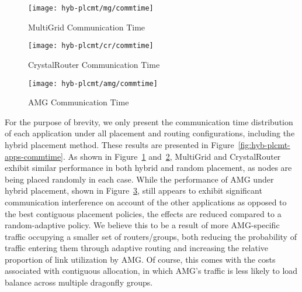 
\begin{figure*}[t!]
    \centering
    \begin{subfigure}[t]{0.32\textwidth}
        \centering
        \texttt{[image: hyb-plcmt/mg/commtime]}
        \caption{MultiGrid Communication Time}
        \label{fig:hyb-plcmt-mg-commtime}
    \end{subfigure}\hfill
    \begin{subfigure}[t]{0.32\textwidth}
        \centering
        \texttt{[image: hyb-plcmt/cr/commtime]}
        \caption{CrystalRouter Communication Time}
        \label{fig:hyb-plcmt-cr-commtime}
    \end{subfigure}\hfill
    \begin{subfigure}[t]{0.32\textwidth}
        \centering
        \texttt{[image: hyb-plcmt/amg/commtime]}
        \caption{AMG Communication Time}
        \label{fig:hyb-plcmt-amg-commtime}
    \end{subfigure}
   \caption{Application communication time. Workload~ is running with all placement and routing configurations. Methods prefixed with ``H'' represent the hybrid allocation approach.}
   \label{fig:hyb-plcmt-apps-commtime}
\end{figure*}

For the purpose of brevity, we only present the
communication time distribution of each application under all placement and routing configurations, including the hybrid placement method. These results are presented in Figure~\ref{fig:hyb-plcmt-apps-commtime}. 
As shown in Figure~\ref{fig:hyb-plcmt-mg-commtime} and~\ref{fig:hyb-plcmt-cr-commtime},
MultiGrid and CrystalRouter exhibit similar performance in both hybrid and random placement, as nodes are being placed randomly in each case.
While the performance of AMG under hybrid placement, shown in Figure~\ref{fig:hyb-plcmt-amg-commtime}, still appears to exhibit significant communication interference on account of the other applications as opposed to the best contiguous placement policies, the effects are reduced compared to a random-adaptive policy. We believe this to be a result of more AMG-specific traffic occupying a smaller set of routers/groups, both reducing the probability of traffic entering them through adaptive routing and increasing the relative proportion of link utilization by AMG. Of course, this comes with the costs associated with contiguous allocation, in which AMG's traffic is less likely to load balance across multiple dragonfly groups.

